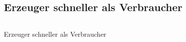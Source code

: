 \subsection{Erzeuger schneller als Verbraucher} %
\label{sub:erzeuger_schneller_als_verbraucher}
\begin{quellcode}[H]
\begin{tiny}
\begin{spacing}{1.0}
\inputminted[bgcolor=bg, tabsize=2, linenos]{console}{esv.txt}
\caption{Erzeuger schneller als Verbraucher}
\label{out:esv}
\end{spacing}
\end{tiny}
\end{quellcode}


